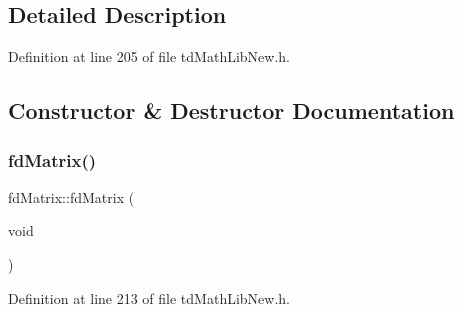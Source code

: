 \subsection{Detailed Description}


Definition at line 205 of file td\+Math\+Lib\+New.\+h.



\subsection{Constructor \& Destructor Documentation}
\hypertarget{classfd_matrix_a4e97779c76db0686a11102353b0ed015}{}\label{classfd_matrix_a4e97779c76db0686a11102353b0ed015} 
\subsubsection{\texorpdfstring{fd\+Matrix()}{fdMatrix()}\hspace{0.1cm}{\footnotesize\ttfamily [1/3]}}
{\footnotesize\ttfamily fd\+Matrix\+::fd\+Matrix (\begin{DoxyParamCaption}\item[{void}]{ }\end{DoxyParamCaption})\hspace{0.3cm}{\ttfamily [inline]}}



Definition at line 213 of file td\+Math\+Lib\+New.\+h.

\hypertarget{classfd_matrix_a53237656ab43ee457035cefc442ef568}{}\label{classfd_matrix_a53237656ab43ee457035cefc442ef568} 
